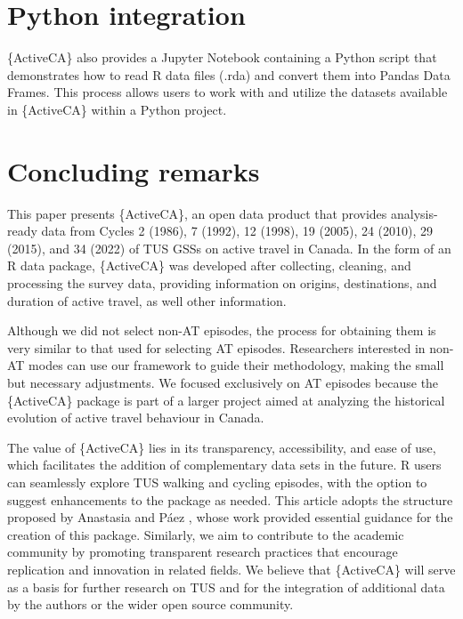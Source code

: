 \documentclass[Royal,times,sageh]{sagej}
\begin{document}
\section{Python integration}\label{python-integration}

\{ActiveCA\} also provides a Jupyter Notebook containing a Python script
that demonstrates how to read R data files (.rda) and convert them into
Pandas Data Frames. This process allows users to work with and utilize
the datasets available in \{ActiveCA\} within a Python project.

\section{Concluding remarks}\label{concluding-remarks}

This paper presents \{ActiveCA\}, an open data product that provides
analysis-ready data from Cycles 2 (1986), 7 (1992), 12 (1998), 19
(2005), 24 (2010), 29 (2015), and 34 (2022) of TUS GSSs on active travel
in Canada. In the form of an R data package, \{ActiveCA\} was developed
after collecting, cleaning, and processing the survey data, providing
information on origins, destinations, and duration of active travel, as
well other information.

Although we did not select non-AT episodes, the process for obtaining
them is very similar to that used for selecting AT episodes. Researchers
interested in non-AT modes can use our framework to guide their
methodology, making the small but necessary adjustments. We focused
exclusively on AT episodes because the \{ActiveCA\} package is part of a
larger project aimed at analyzing the historical evolution of active
travel behaviour in Canada.

The value of \{ActiveCA\} lies in its transparency, accessibility, and
ease of use, which facilitates the addition of complementary data sets
in the future. R users can seamlessly explore TUS walking and cycling
episodes, with the option to suggest enhancements to the package as
needed. This article adopts the structure proposed by Anastasia and Páez
\citeyearpar{soukhov2023}, whose work provided essential guidance for
the creation of this package. Similarly, we aim to contribute to the
academic community by promoting transparent research practices that
encourage replication and innovation in related fields. We believe that
\{ActiveCA\} will serve as a basis for further research on TUS and for
the integration of additional data by the authors or the wider open
source community.
\end{document}
